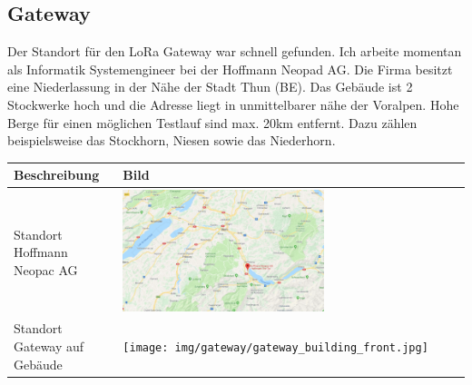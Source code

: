 \documentclass[11pt,english,german]{report}
\theoremstyle{definition}
\begin{document}
\subsection{Gateway}
Der Standort für den LoRa Gateway war schnell gefunden. Ich arbeite momentan als Informatik Systemengineer bei der Hoffmann Neopad AG. Die Firma besitzt eine Niederlassung in der Nähe der Stadt Thun (BE). Das Gebäude ist 2 Stockwerke hoch und die Adresse liegt in unmittelbarer nähe der Voralpen. Hohe Berge für einen möglichen Testlauf sind max. 20km entfernt. Dazu zählen beispielsweise das Stockhorn, Niesen sowie das Niederhorn.\\[0.1cm]
\begin{tabularx}{\textwidth}{ l|X }
		\textbf{Beschreibung} & \textbf{Bild} \\ \hline
		Standort Hoffmann Neopac AG & \parbox[c]{1em}{
			\vspace{8pt}\includegraphics[width=0.6\textwidth]{img/gateway/gateway_map.png}\vspace{8pt}} \\ \hline
		Standort Gateway auf Gebäude &  \parbox[c]{1em}{
			\vspace{8pt}\texttt{[image: img/gateway/gateway\_building\_front.jpg]}\vspace{8pt}} \\ \hline
\end{tabularx}

\newpage
\end{document}
